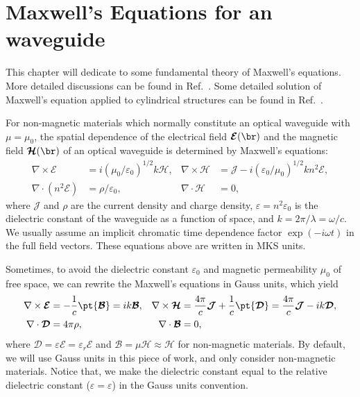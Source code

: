 \chapter{Maxwell's Equations for an waveguide}
This chapter will dedicate to some fundamental theory of Maxwell's equations. More detailed 
discussions can be found in Ref.~\cite{Snyder1983}. Some detailed solution of Maxwell's equation 
applied to cylindrical structures can be found in Ref.~\cite{Wait1959}. 

For non-magnetic materials which normally constitute an optical waveguide with $ \mu=\mu_0 $, the 
spatial dependence of the electrical field $ \boldsymbol{\mathcal{E}}(\br) $ and the magnetic field $ 
\boldsymbol{\mathcal{H}}(\br) $ of an optical waveguide is determined by Maxwell's equations:
\begin{align}
\nabla\times \boldsymbol{\mathcal{E}} &= i(\mu_0/\varepsilon_0)^{1/2} k \boldsymbol{\mathcal{H}}, & 
\nabla\times \boldsymbol{\mathcal{H}} &= \boldsymbol{\mathcal{J}}-i(\varepsilon_0/\mu_0)^{1/2}kn^2 
\boldsymbol{\mathcal{E}}, \label{EHtimesMKS}\\
\nabla\cdot (n^2 \boldsymbol{\mathcal{E}}) &= \rho/\varepsilon_0, & \nabla\cdot 
\boldsymbol{\mathcal{H}} &=0, \label{EHdotsMKS}
\end{align}
where $ \boldsymbol{\mathcal{J}} $ and $ \rho $ are the current density and charge density, $ 
\varepsilon=n^2 \varepsilon_0 $ is the dielectric constant of the waveguide as a function of space, and $ 
k=2\pi/\lambda=\omega/c $.  We usually assume an implicit chromatic time dependence factor $ \exp(-i\omega t) $ in the 
full field vectors. These equations above are written in MKS units. 

Sometimes, to avoid the dielectric constant $ \varepsilon_0 $ and magnetic permeability $ \mu_0 $ of 
free space, we can rewrite the Maxwell's equations in Gauss units, which yield
\begin{align}
\nabla \times \boldsymbol{\mathcal{E}} &= -\frac{1}{c} \pt{\boldsymbol{\mathcal{B}}}=i 
k\boldsymbol{\mathcal{B}}, & \nabla \times 
\boldsymbol{\mathcal{H}} &= \frac{4\pi}{c} \boldsymbol{\mathcal{J}} + 
\frac{1}{c}\pt{\boldsymbol{\mathcal{D}}}= \frac{4\pi}{c}\boldsymbol{\mathcal{J}} 
-ik\boldsymbol{\mathcal{D}}, \label{eq:maxwelldiv}\\
\nabla \cdot \boldsymbol{\mathcal{D}} &= 4\pi \rho, & \nabla \cdot \boldsymbol{\mathcal{B}} &=0,\label{eq:maxwellgrad}
\end{align}
where $ \boldsymbol{\mathcal{D}} = \varepsilon \boldsymbol{\mathcal{E}}=\varepsilon_r \boldsymbol{\mathcal{E}} $ and $ 
\boldsymbol{\mathcal{B}}= \mu\boldsymbol{\mathcal{H}}\approx \boldsymbol{\mathcal{H}} $ for non-magnetic materials. By default, we will use Gauss units in this piece of work, and only consider non-magnetic materials. Notice that, we make the dielectric constant equal to the relative dielectric constant ($ \varepsilon=\varepsilon $) in the Gauss units convention.  

